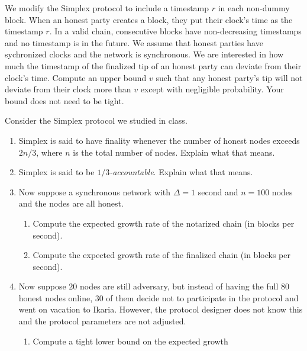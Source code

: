\begin{problems}
    \item We modify the Simplex protocol to include a timestamp $r$ in each non-dummy
        block. When an honest party creates a block, they put their clock's time as the
        timestamp $r$. In a valid chain, consecutive blocks have non-decreasing
        timestamps and no timestamp is in the future. We assume that honest parties have
        sychronized clocks and the network is synchronous.
        We are interested in how much the timestamp of the finalized tip of an
        honest party can deviate from their clock's time. Compute an upper bound $v$ such
        that any honest party's tip will not deviate from their clock more than $v$
        except with negligible probability. Your bound does not need to be tight.
    
    \item Consider the Simplex protocol we studied in class.
        \begin{enumerate}
            \item Simplex is said to have finality whenever the number of honest
                nodes exceeds $2n/3$, where $n$ is the total number of nodes. Explain
                what that means.
            \item Simplex is said to be {\em $1/3$-accountable}. Explain what
                that means.
            \item Now suppose a synchronous network with $\Delta = 1$ second and
                $n = 100$ nodes and the nodes are all honest.
                \begin{enumerate}
                    \item Compute the expected growth rate of the notarized
                        chain (in blocks per second).
                    \item Compute the expected growth rate of the finalized
                        chain (in blocks per second).
                \end{enumerate}
            \item Now suppose $20$ nodes are still adversary, but instead of having the
                full $80$ honest nodes online, $30$ of them decide not to participate in
                the protocol and went on vacation to Ikaria. However, the protocol
                designer does not know this and the protocol parameters are not
                adjusted.
                \begin{enumerate}
                \item Compute a tight lower bound on the expected growth

\end{enumerate}
\end{enumerate}
\end{problems}
